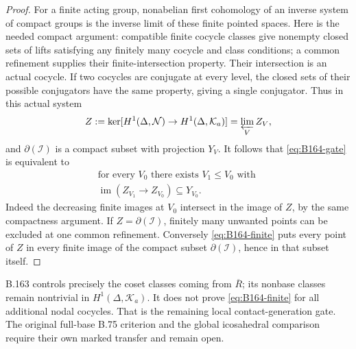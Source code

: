\begin{proof}
For a finite acting group, nonabelian first cohomology of an inverse
system of compact groups is the inverse limit of these finite pointed
spaces. Here is the needed compact argument: compatible finite cocycle
classes give nonempty closed sets of lifts satisfying any finitely
many cocycle and class conditions; a common refinement supplies their
finite-intersection property. Their intersection is an actual cocycle.
If two cocycles are conjugate at every level, the closed sets of their
possible conjugators have the same property, giving a single conjugator.
Thus in this actual system
\[
 Z:=\ker[H^1(\Delta,\mathcal N)\to H^1(\Delta,\mathcal K_a)]
       =\varprojlim_V Z_V,
\]
and $\partial(\mathcal I)$ is a compact subset with projection $Y_V$.
It follows that \eqref{eq:B164-gate} is equivalent to
\begin{equation}\label{eq:B164-finite}
 \begin{gathered}
 \text{for every }V_0\text{ there exists }V_1\le V_0
 \text{ with }\\
 \operatorname{im}(Z_{V_1}\to Z_{V_0})\subseteq Y_{V_0}.
 \end{gathered}
\end{equation}
Indeed the decreasing finite images at $V_0$ intersect in the image
of $Z$, by the same compactness argument. If $Z=\partial(\mathcal I)$,
finitely many unwanted points can be excluded at one common refinement.
Conversely \eqref{eq:B164-finite} puts every point of $Z$ in every
finite image of the compact subset $\partial(\mathcal I)$, hence in
that subset itself.
\end{proof}
B.163 controls precisely the coset classes coming from $\overline R$;
its nonbase classes remain nontrivial in $H^1(\Delta,\mathcal K_a)$.
It does not prove \eqref{eq:B164-finite} for all additional nodal
cocycles. That is the remaining local contact-generation gate.
The original full-base B.75 criterion and the global icosahedral
comparison require their own marked transfer and remain open.
